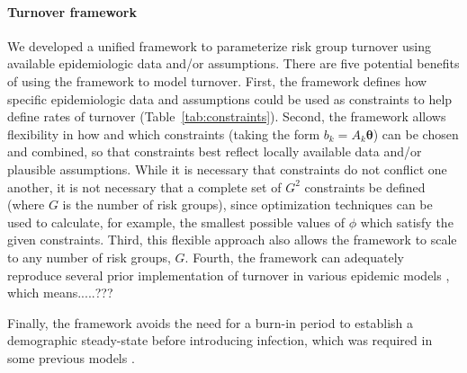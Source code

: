 \paragraph{Turnover framework}
We developed a unified framework 
to parameterize risk group turnover
using available epidemiologic data and/or assumptions.
There are five potential benefits of using the framework to model turnover.
First, the framework defines how specific epidemiologic data and assumptions
could be used as constraints to help define rates of turnover
(Table~\ref{tab:constraints}).
Second, the framework allows flexibility in how and which
constraints (taking the form $b_k = A_k \bm{\theta}$)
can be chosen and combined, so that constraints best reflect
locally available data and/or plausible assumptions.
While it is necessary that constraints do not conflict one another,
it is not necessary that a complete set of $G^2$ constraints be defined
(where $G$ is the number of risk groups),
since optimization techniques can be used to calculate, for example,
the smallest possible values of $\phi$ which satisfy the given constraints. %
Third, this flexible approach also allows the framework to scale
to any number of risk groups, $G$.
Fourth, the framework can adequately reproduce 
several prior implementation of 
turnover in various epidemic models \citep{Stigum1994,Eaton2014,Henry2015}, 	%
which means.....??? %


Finally, the framework avoids the need for a burn-in period
to establish a demographic steady-state before introducing infection,
which was required in some previous models \citep{Boily2015}.

